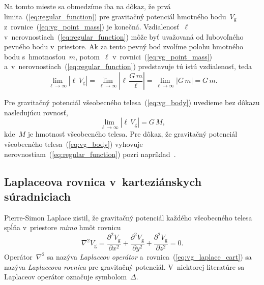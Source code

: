 \documentclass[a4paper, 12pt]{book}
\newcommand{\gidx}{\mathrm g}
\begin{document}
Na tomto mieste sa obmedzíme iba na dôkaz, že prvá 
limita~(\ref{eq:regular_function}) pre gravitačný potenciál hmotného 
bodu~$V_\gidx$ z~rovnice~(\ref{eq:vg_point_mass}) je konečná.  
Vzdialenosť~$\ell$ v~nerovnostiach~(\ref{eq:regular_function}) môže byť 
uvažovaná od ľubovoľného pevného bodu v~priestore.  Ak za tento pevný bod 
zvolíme polohu hmotného bodu s~hmotnosťou~$m$, potom~$\ell$ 
v~rovnici~(\ref{eq:vg_point_mass}) 
a~v~nerovnostiach~(\ref{eq:regular_function}) predstavuje tú istú vzdialenosť, 
teda
%
\begin{equation}
\lim_{\ell \rightarrow \infty} \left| \ell \, V_\gidx \right| = \lim_{\ell 
\rightarrow \infty} \left| \ell \, \frac{G \, m}{\ell} \right| = \lim_{\ell 
\rightarrow \infty} \left| G \, m \right| = G \, m{.}
\end{equation}

Pre gravitačný potenciál všeobecného telesa~(\ref{eq:vg_body}) uvedieme bez 
dôkazu nasledujúcu rovnosť,
%
\begin{equation}
\label{eq:vg_regular}
\lim_{\ell \rightarrow \infty} \left| \ell \, V_\gidx \right| = G \, M{,}
\end{equation}
%
kde~$M$ je hmotnosť všeobecného telesa.  Pre dôkaz, že gravitačný potenciál 
všeobecného telesa~(\ref{eq:vg_body}) vyhovuje 
nerovnostiam~(\ref{eq:regular_function}) pozri napríklad~\textcite{Pick1973}.





\subsection{Laplaceova rovnica v~karteziánskych súradniciach}
\label{sec:laplace_equation_cart}

Pierre-Simon Laplace zistil, že gravitačný potenciál každého všeobecného telesa
spĺňa v~priestore \emph{mimo} hmôt rovnicu
%
\begin{equation}
\label{eq:vg_laplace_cart}
\nabla^2 V_\gidx = \frac{\partial^2 V_\gidx}{\partial x^2} + \frac{\partial^2 
V_\gidx}{\partial y^2} + \frac{\partial^2 V_\gidx}{\partial z^2} = 0{.}
\end{equation}
%
Operátor~$\nabla^2$ sa nazýva \emph{Laplaceov operátor} 
a~rovnica~(\ref{eq:vg_laplace_cart}) sa nazýva \emph{Laplaceova rovnica} pre
gravitačný potenciál.  V~niektorej literatúre sa Laplaceov operátor označuje 
symbolom~$\Delta$.
\end{document}
